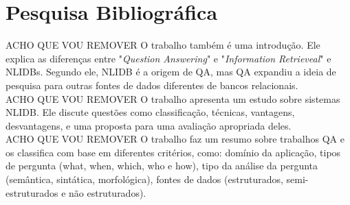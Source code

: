\documentclass{article}
\begin{document}
\section{Pesquisa Bibliográfica}


ACHO QUE VOU REMOVER
O trabalho \citep{kolomiyets2011survey} também é uma introdução. Ele explica as diferenças entre "\textit{Question Answering}" e "\textit{Information Retrieveal}" e NLIDBs. Segundo ele, NLIDB é a origem de QA, mas QA expandiu a ideia de pesquisa para outras fontes de dados diferentes de bancos relacionais. \\

ACHO QUE VOU REMOVER
O trabalho \citep{pazos2013natural} apresenta um estudo sobre sistemas NLIDB. Ele discute questões como classificação, técnicas, vantagens, desvantagens, e uma proposta para uma avaliação apropriada deles. \\

ACHO QUE VOU REMOVER
O trabalho \citep{mishra2016survey} faz um resumo sobre trabalhos QA e os classifica com base em diferentes critérios, como: domínio da aplicação, tipos de pergunta (what, when, which, who e how), tipo da análise da pergunta (semântica, sintática, morfológica), fontes de dados (estruturados, semi-estruturados e não estruturados). \\













\end{document}
